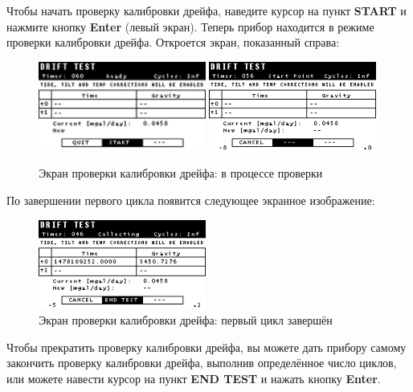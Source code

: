 Чтобы начать проверку калибровки дрейфа, наведите курсор на пункт \textbf{START}
и нажмите кнопку \textbf{Enter} (левый экран). Теперь прибор \cg{} находится в
режиме проверки калибровки дрейфа. Откроется экран, показанный справа:

\begin{figure}[H]
  \centering
  \includegraphics[width=0.49\textwidth]{figures/the_drift_calibration_test_screen_test_in_progress_1}
  \includegraphics[width=0.49\textwidth]{figures/the_drift_calibration_test_screen_test_in_progress_2}
  \caption{Экран проверки калибровки дрейфа: в процессе проверки}
  \label{fig:the_drift_calibration_test_screen_test_in_progress}
\end{figure}

По завершении первого цикла появится следующее экранное изображение:

\begin{figure}[H]
  \centering
  \includegraphics[width=0.49\textwidth]{figures/the_drift_calibration_test_active_screen_first_cycle_completed}
  \caption{Экран проверки калибровки дрейфа: первый цикл завершён}
  \label{fig:the_drift_calibration_test_active_screen_first_cycle_completed}
\end{figure}

Чтобы прекратить проверку калибровки дрейфа, вы можете дать прибору \cg{} самому
закончить проверку калибровки дрейфа, выполнив определённое число циклов, или
можете навести курсор на пункт \textbf{END TEST} и нажать кнопку \textbf{Enter}.

